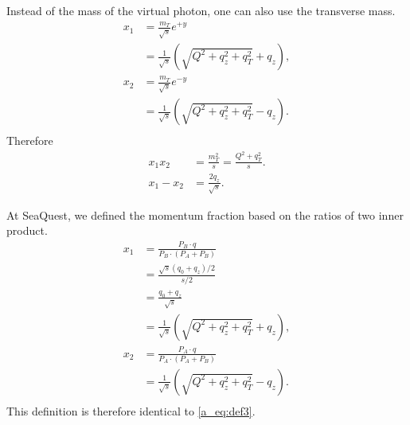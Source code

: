 \documentclass[../main.tex]{subfiles}
\begin{document}
Instead of the mass of the virtual photon, one can also use the transverse mass.
\begin{equation}
    \begin{split}
        x_1 &= \frac{m_T}{\sqrt{s}} e^{+y}\\
            &=\frac{1}{\sqrt{s}}\left(\sqrt{Q^2+q_z^2+q_T^2}+q_z\right),\\
        x_2 &= \frac{m_T}{\sqrt{s}} e^{-y}\\
            &= \frac{1}{\sqrt{s}}\left(\sqrt{Q^2+q_z^2+q_T^2}-q_z\right).\\
    \end{split}
		\label{a_eq:def3}
\end{equation}
Therefore
\begin{equation}
    \begin{split}
        x_1x_2 &= \frac{m_T^2}{s} = \frac{Q^2+q_T^2}{s}.\\
        x_1-x_2 &= \frac{2q_z}{\sqrt{s}}.
    \end{split}
\end{equation}
\clearpage

At SeaQuest, we defined the momentum fraction based on the ratios of two inner product. 
\begin{equation}
    \begin{split}
        x_1 &= \frac{P_B\cdot q}{P_B\cdot (P_A+P_B)}\\
            &= \frac{\sqrt{s}(q_0+q_z)/2}{s/2}\\
            &= \frac{q_0+q_z}{\sqrt{s}}\\
            &= \frac{1}{\sqrt{s}}\left(\sqrt{Q^2+q_z^2+q_T^2}+q_z\right),\\
        x_2 &= \frac{P_A\cdot q}{P_A\cdot (P_A+P_B)}\\
            &= \frac{1}{\sqrt{s}}\left(\sqrt{Q^2+q_z^2+q_T^2}-q_z\right).\\
    \end{split}
\end{equation}
This definition is therefore identical to \cref{a_eq:def3}.
\end{document}
